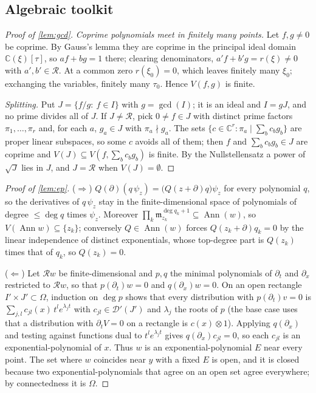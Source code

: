 \documentclass[11pt]{article}
\theoremstyle{plain}
\theoremstyle{definition}
\theoremstyle{remark}
\newcommand{\C}{\mathbb{C}}
\newcommand{\ring}{\mathcal{R}}            %
\DeclareMathOperator{\Ann}{Ann}             %
\DeclareMathOperator{\gcdop}{gcd}
\newcommand{\Var}{V}                        %
\begin{document}
\subsection{Algebraic toolkit}
\begin{proof}[Proof of \cref{lem:gcd}]
\emph{Coprime polynomials meet in finitely many points.} Let $f,g\ne0$ be coprime. By Gauss's lemma they are
coprime in the principal ideal domain $\C(\xi)[\tau]$, so $af+bg=1$ there; clearing denominators,
$a'f+b'g=r(\xi)\ne0$ with $a',b'\in\ring$. At a common zero $r(\xi_0)=0$, which leaves finitely many $\xi_0$;
exchanging the variables, finitely many $\tau_0$. Hence $\Var(f,g)$ is finite.

\emph{Splitting.} Put $J=\{f/g:\ f\in I\}$ with $g=\gcdop(I)$; it is an ideal and $I=gJ$, and no prime divides all
of $J$. If $J\ne\ring$, pick $0\ne f\in J$ with distinct prime factors $\pi_1,\dots,\pi_r$ and, for each $a$,
$g_a\in J$ with $\pi_a\nmid g_a$. The sets $\{c\in\C^r:\pi_a\mid\sum_bc_bg_b\}$ are proper linear subspaces, so some
$c$ avoids all of them; then $f$ and $\sum_bc_bg_b\in J$ are coprime and $\Var(J)\subseteq\Var(f,\sum_bc_bg_b)$ is
finite. By the Nullstellensatz a power of $\sqrt J$ lies in $J$, and $J=\ring$ when $\Var(J)=\emptyset$.
\end{proof}

\begin{proof}[Proof of \cref{lem:ep}]
($\Rightarrow$) $Q(\partial)(q\,\psi_z)=\big(Q(z+\partial)q\big)\psi_z$ for every polynomial $q$, so the derivatives of
$q\,\psi_z$ stay in the finite-dimensional space of polynomials of degree $\le\deg q$ times $\psi_z$. Moreover
$\prod_k\mathfrak m_{z_k}^{\deg q_k+1}\subseteq\Ann(w)$, so $\Var(\Ann w)\subseteq\{z_k\}$; conversely
$Q\in\Ann(w)$ forces $Q(z_k+\partial)q_k=0$ by the linear independence of distinct exponentials, whose top-degree part
is $Q(z_k)$ times that of $q_k$, so $Q(z_k)=0$.

($\Leftarrow$) Let $\ring w$ be finite-dimensional and $p,q$ the minimal polynomials of $\partial_t$ and
$\partial_x$ restricted to $\ring w$, so that $p(\partial_t)w=0$ and $q(\partial_x)w=0$. On an open rectangle $I'\times J'\subset\Omega$, induction
on $\deg p$ shows that every distribution with $p(\partial_t)v=0$ is $\sum_{j,l}c_{jl}(x)\,t^le^{\lambda_jt}$ with
$c_{jl}\in\mathcal D'(J')$ and $\lambda_j$ the roots of $p$ (the base case uses that a distribution with
$\partial_tV=0$ on a rectangle is $c(x)\otimes1$). Applying $q(\partial_x)$ and testing against functions dual to
$t^le^{\lambda_jt}$ gives $q(\partial_x)c_{jl}=0$, so each $c_{jl}$ is an exponential-polynomial of $x$. Thus $w$ is an
exponential-polynomial $E$ near every point. The set where $w$ coincides near $y$ with a fixed $E$ is open, and it is
closed because two exponential-polynomials that agree on an open set agree everywhere; by connectedness it is
$\Omega$.
\end{proof}
\end{document}
